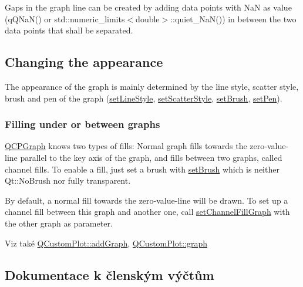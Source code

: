 Gaps in the graph line can be created by adding data points with Na\+N as value ({\ttfamily q\+Q\+Na\+N()} or {\ttfamily std\+::numeric\+\_\+limits$<$double$>$\+::quiet\+\_\+\+Na\+N()}) in between the two data points that shall be separated.\hypertarget{classQCPStatisticalBox_appearance}{}\subsection{Changing the appearance}\label{classQCPStatisticalBox_appearance}
The appearance of the graph is mainly determined by the line style, scatter style, brush and pen of the graph (\hyperlink{classQCPGraph_a513fecccff5b2a50ce53f665338c60ff}{set\+Line\+Style}, \hyperlink{classQCPGraph_a12bd17a8ba21983163ec5d8f42a9fea5}{set\+Scatter\+Style}, \hyperlink{classQCPAbstractPlottable_a7a4b92144dca6453a1f0f210e27edc74}{set\+Brush}, \hyperlink{classQCPAbstractPlottable_ab74b09ae4c0e7e13142fe4b5bf46cac7}{set\+Pen}).\hypertarget{classQCPGraph_filling}{}\subsubsection{Filling under or between graphs}\label{classQCPGraph_filling}
\hyperlink{classQCPGraph}{Q\+C\+P\+Graph} knows two types of fills\+: Normal graph fills towards the zero-\/value-\/line parallel to the key axis of the graph, and fills between two graphs, called channel fills. To enable a fill, just set a brush with \hyperlink{classQCPAbstractPlottable_a7a4b92144dca6453a1f0f210e27edc74}{set\+Brush} which is neither Qt\+::\+No\+Brush nor fully transparent.

By default, a normal fill towards the zero-\/value-\/line will be drawn. To set up a channel fill between this graph and another one, call \hyperlink{classQCPGraph_a2d03156df1b64037a2e36cfa50351ca3}{set\+Channel\+Fill\+Graph} with the other graph as parameter.

\begin{DoxySeeAlso}{Viz také}
\hyperlink{classQCustomPlot_a6fb2873d35a8a8089842d81a70a54167}{Q\+Custom\+Plot\+::add\+Graph}, \hyperlink{classQCustomPlot_a6d3ed93c2bf46ab7fa670d66be4cddaf}{Q\+Custom\+Plot\+::graph} 
\end{DoxySeeAlso}


\subsection{Dokumentace k členským výčtům}
\hypertarget{classQCPGraph_ad23b514404bd2cb3216f57c90904d6af}{}
